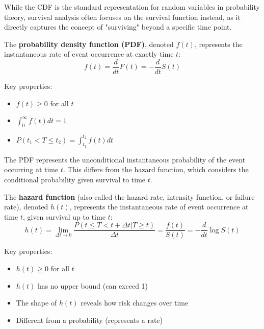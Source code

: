 While the CDF is the standard representation for random variables in probability theory, survival analysis often focuses on the survival function instead, as it directly captures the concept of "surviving" beyond a specific time point.

\begin{definitionbox}[title=Probability Density Function]
The \textbf{probability density function (PDF)}, denoted $f(t)$, represents the instantaneous rate of event occurrence at exactly time $t$:
\begin{equation}
    f(t) = \frac{d}{dt}F(t) = -\frac{d}{dt}S(t)
\end{equation}

Key properties:
\begin{itemize}
    \item $f(t) \geq 0$ for all $t$
    \item $\int_0^\infty f(t)dt = 1$
    \item $P(t_1 < T \leq t_2) = \int_{t_1}^{t_2} f(t)dt$
\end{itemize}
\end{definitionbox}

The PDF represents the unconditional instantaneous probability of the event occurring at time $t$. This differs from the hazard function, which considers the conditional probability given survival to time $t$.

\begin{definitionbox}[title=Hazard Function]
The \textbf{hazard function} (also called the hazard rate, intensity function, or failure rate), denoted $h(t)$, represents the instantaneous rate of event occurrence at time $t$, given survival up to time $t$:
\begin{equation}
    h(t) = \lim_{\Delta t \to 0} \frac{P(t \leq T < t + \Delta t | T \geq t)}{\Delta t} = \frac{f(t)}{S(t)} = -\frac{d}{dt}\log S(t)
\end{equation}

Key properties:
\begin{itemize}
    \item $h(t) \geq 0$ for all $t$
    \item $h(t)$ has no upper bound (can exceed 1)
    \item The shape of $h(t)$ reveals how risk changes over time
    \item Different from a probability (represents a rate)
\end{itemize}
\end{definitionbox}

